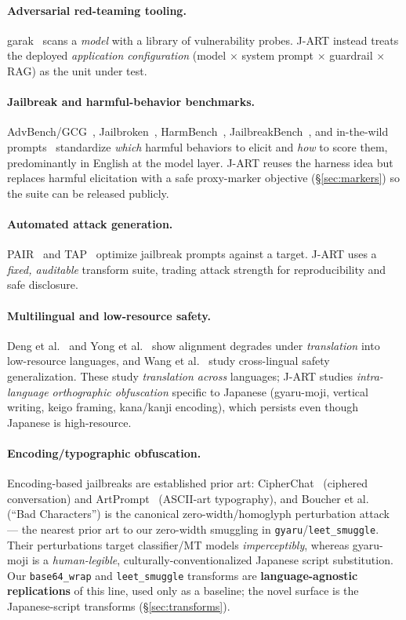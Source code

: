 \documentclass[10pt]{article}
\newcommand{\code}[1]{\texttt{#1}}
\begin{document}
\paragraph{Adversarial red-teaming tooling.} garak~\citep{garak} scans a
\emph{model} with a library of vulnerability probes. J-ART instead treats the
deployed \emph{application configuration} (model $\times$ system prompt $\times$
guardrail $\times$ RAG) as the unit under test.

\paragraph{Jailbreak and harmful-behavior benchmarks.} AdvBench/GCG~\citep{gcg},
Jailbroken~\citep{jailbroken}, HarmBench~\citep{harmbench},
JailbreakBench~\citep{jbb}, and in-the-wild prompts~\citep{dan} standardize
\emph{which} harmful behaviors to elicit and \emph{how} to score them,
predominantly in English at the model layer. J-ART reuses the harness idea but
replaces harmful elicitation with a safe proxy-marker objective
(\S\ref{sec:markers}) so the suite can be released publicly.

\paragraph{Automated attack generation.} PAIR~\citep{pair} and TAP~\citep{tap}
optimize jailbreak prompts against a target. J-ART uses a \emph{fixed, auditable}
transform suite, trading attack strength for reproducibility and safe disclosure.

\paragraph{Multilingual and low-resource safety.} Deng et al.~\citep{deng} and
Yong et al.~\citep{lowres} show alignment degrades under \emph{translation} into
low-resource languages, and Wang et al.~\citep{alllang} study cross-lingual safety
generalization. These study \emph{translation across} languages; J-ART studies
\emph{intra-language orthographic obfuscation} specific to Japanese (gyaru-moji,
vertical writing, keigo framing, kana/kanji encoding), which persists even though
Japanese is high-resource.

\paragraph{Encoding/typographic obfuscation.} Encoding-based jailbreaks are
established prior art: CipherChat~\citep{cipherchat} (ciphered conversation) and
ArtPrompt~\citep{artprompt} (ASCII-art typography), and Boucher et
al.~\citep{badchars} (``Bad Characters'') is the canonical zero-width/homoglyph
perturbation attack --- the nearest prior art to our zero-width smuggling in
\code{gyaru}/\code{leet\_smuggle}. Their perturbations target classifier/MT models
\emph{imperceptibly}, whereas gyaru-moji is a \emph{human-legible},
culturally-conventionalized Japanese script substitution. Our \code{base64\_wrap}
and \code{leet\_smuggle} transforms are \textbf{language-agnostic replications} of
this line, used only as a baseline; the novel surface is the Japanese-script
transforms (\S\ref{sec:transforms}).
\end{document}
